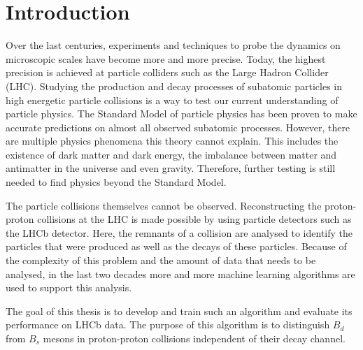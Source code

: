 \chapter{Introduction}

Over the last centuries, experiments and techniques to probe the dynamics on microscopic scales have become more and more precise.
Today, the highest precision is achieved at particle colliders such as the Large Hadron Collider (LHC).
Studying the production and decay processes of subatomic particles in high energetic particle collisions is a way to test our current understanding of particle physics.
The Standard Model of particle physics has been proven to make accurate predictions on almost all observed subatomic processes.
However, there are multiple physics phenomena this theory cannot explain.
This includes the existence of dark matter and dark energy, the imbalance between matter and antimatter in the universe and even gravity.
Therefore, further testing is still needed to find physics beyond the Standard Model.

The particle collisions themselves cannot be observed.
Reconstructing the proton-proton collisions at the LHC is made possible by using particle detectors such as the LHCb detector.
Here, the remnants of a collision are analysed to identify the particles that were produced as well as the decays of these particles.
Because of the complexity of this problem and the amount of data that needs to be analysed, in the last two decades more and more machine learning algorithms are used to support this analysis.

The goal of this thesis is to develop and train such an algorithm and evaluate its performance on LHCb data.
The purpose of this algorithm is to distinguish $B_d$ from $B_s$ mesons in proton-proton collisions independent of their decay channel. 




















